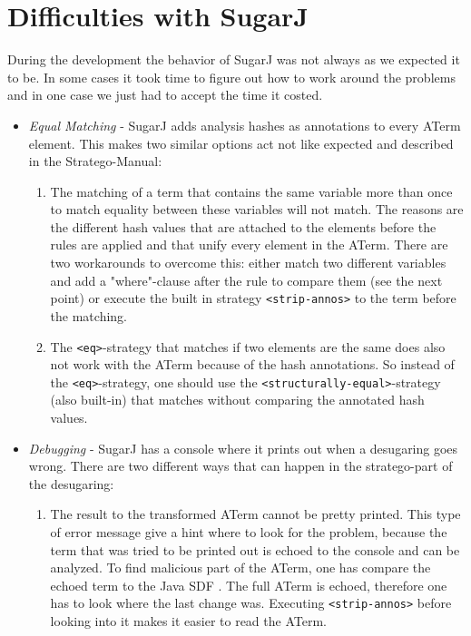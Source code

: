 \documentclass{report}
\begin{document}
\section{Difficulties with SugarJ}
During the development the behavior of SugarJ was not always as we expected it to be. In some cases it took time to figure out how to work around the problems and in one case we just had to accept the time it costed.
\begin{itemize}
\item \emph{Equal Matching} - SugarJ adds analysis hashes as annotations to every ATerm element. This makes two similar options act not like expected and described in the Stratego-Manual\cite{Stratego-Manual}:
\begin{enumerate}
 \item The matching of a term that contains the same variable more than once to match equality between these variables will not match. The reasons are the different hash values that are attached to the elements before the rules are applied and that unify every element in the ATerm. There are two workarounds to overcome this: either match  two different variables and add a "where"-clause after the rule to compare them (see the next point) or execute the built in strategy \lstinline{<strip-annos>} to the term before the matching.
 \item The \lstinline{<eq>}-strategy that matches if two elements are the same does also not work with the ATerm because of the hash annotations.  So instead of the \lstinline{<eq>}-strategy, one should use the \lstinline{<structurally-equal>}-strategy (also built-in) that matches without comparing the annotated hash values.
\end{enumerate}
\item \emph{Debugging} - SugarJ has a console where it prints out when a desugaring goes wrong. There are two different ways that can happen in the stratego-part of the desugaring:
\begin{enumerate}
 \item The result to the transformed ATerm cannot be pretty printed. This type of error message give a hint where to look for the problem, because the term that was tried to be printed out is echoed to the console and can be analyzed. To find malicious part of the ATerm, one has compare the echoed term to the Java SDF \cite{Java-SDF-2014}. The full ATerm is echoed, therefore one has to look where the last change was. Executing \lstinline{<strip-annos>} before looking into it makes it easier to read the ATerm.

\end{enumerate}
\end{itemize}
\end{document}
